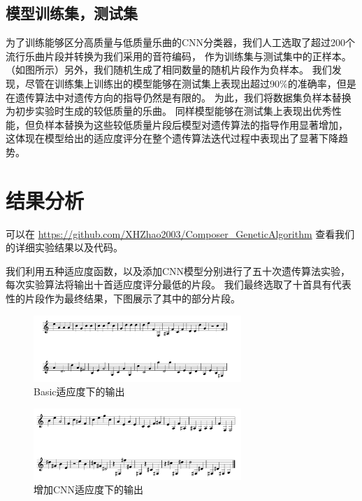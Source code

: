 \documentclass{article}
\begin{document}
\subsection{模型训练集，测试集}
为了训练能够区分高质量与低质量乐曲的CNN分类器，我们人工选取了超过200个流行乐曲片段并转换为我们采用的音符编码，
作为训练集与测试集中的正样本。（如图所示）另外，我们随机生成了相同数量的随机片段作为负样本。
我们发现，尽管在训练集上训练出的模型能够在测试集上表现出超过90\%的准确率，但是在遗传算法中对遗传方向的指导仍然是有限的。
为此，我们将数据集负样本替换为初步实验时生成的较低质量的乐曲。
同样模型能够在测试集上表现出优秀性能，但负样本替换为这些较低质量片段后模型对遗传算法的指导作用显著增加，
这体现在模型给出的适应度评分在整个遗传算法迭代过程中表现出了显著下降趋势。

\section{结果分析}
可以在 \url{https://github.com/XHZhao2003/Composer_GeneticAlgorithm} 查看我们的详细实验结果以及代码。

我们利用五种适应度函数，以及添加CNN模型分别进行了五十次遗传算法实验，每次实验算法将输出十首适应度评分最低的片段。
我们最终选取了十首具有代表性的片段作为最终结果，下图展示了其中的部分片段。

\begin{figure}[htbp] 
    \centering
    \includegraphics[width=0.7\textwidth]{result1.png} 
    \caption{Basic适应度下的输出} 
\end{figure}

\begin{figure}[htbp] 
    \centering
    \includegraphics[width=0.7\textwidth]{result2.png} 
    \caption{增加CNN适应度下的输出} 
\end{figure}
\end{document}
